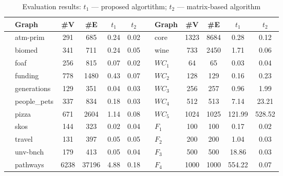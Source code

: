 {\setlength{\tabcolsep}{0.4em}
\begin{table}[ht]
\centering
\caption{Evaluation results: $t_1$ --- proposed algortithm; $t_2$ --- matrix-based algorithm}
\label{tbl:tableRDF}
\begin{tabular}{| c | p{1.6cm} | c | c | c | c || c | p{0.8cm} | c | c | c | c |}
    \hline
      &  Graph              & \#V & \#E  & $t_1$  & $t_2$ &  & Graph & \#V & \#E     & $t_1$    & $t_2$ \\
       \hline
       \hline
    \parbox[t]{2mm}{}
      & \small{atm-prim}                    & 291 & 685     & 0.24   & 0.02 &
     \parbox[t]{2mm}{} & \small{core}                        & 1323 & 8684   & 0.28  &  0.12   \\
      & \small{biomed}                      & 341 & 711     & 0.24  & 0.05 & & \small{wine}                        & 733 & 2450    & 1.71  & 0.06      \\
      & \small{foaf}                        & 256 & 815     & 0.07  & 0.02 &
      \parbox[t]{2mm}{} & $WC_1$& 64 & 65 & 0.03 & 0.04      \\
      & \small{funding}                     & 778 & 1480    & 0.43  & 0.07 & & $WC_2$ & 128 & 129 & 0.16 & 0.23      \\
      & \small{generations}                 & 129 & 351     & 0.04  & 0.03 & & $WC_3$ & 256 & 257 & 0.96 & 1.99    \\
      & \small{people\_pets}                & 337 & 834     & 0.18  & 0.03 & & $WC_4$ & 512 & 513 & 7.14 & 23.21      \\
      & \small{pizza}                       & 671 & 2604    & 1.14  & 0.08 & & $WC_5$ & 1024& 1025&  121.99 & 528.52      \\ 
      & \small{skos}                        & 144 & 323     & 0.02  & 0.04 &
      \parbox[t]{2mm}{} & $F_1$ & 100 & 100 & 0.17 &  0.02     \\
      & \small{travel}                      & 131 & 397     & 0.05  & 0.05 & & $F_2$ & 200 & 200 & 1.04 & 0.03        \\
      & \small{unv-bnch}                    & 179 & 413     & 0.05  & 0.04 & & $F_3$ & 500 & 500 & 18.86  & 0.03   \\
      & \small{pathways}                    & 6238 & 37196  & 4.88 &   0.18 & & $F_4$ & 1000 & 1000& 554.22 & 0.07       \\
      \hline
  \end{tabular}
\end{table}
}

